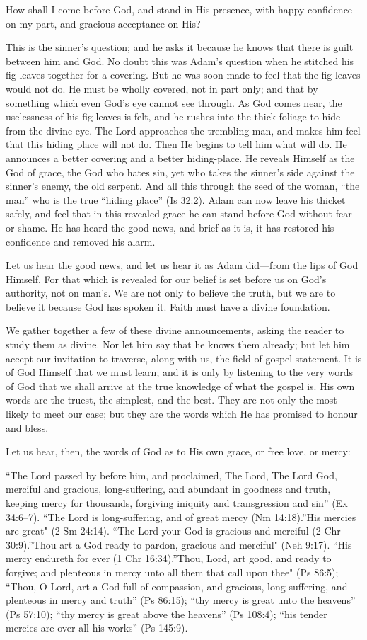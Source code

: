 \documentclass[
]{book}
\begin{document}
How shall I come before God, and stand in His presence, with happy confidence on my part, and gracious acceptance on His?

This is the sinner's question; and he asks it because he knows that there is guilt between him and God. No doubt this was Adam's question when he stitched his fig leaves together for a covering. But he was soon made to feel that the fig leaves would not do. He must be wholly covered, not in part only; and that by something which even God's eye cannot see through. As God comes near, the uselessness of his fig leaves is felt, and he rushes into the thick foliage to hide from the divine eye. The Lord approaches the trembling man, and makes him feel that this hiding place will not do. Then He begins to tell him what will do. He announces a better covering and a better hiding-place. He reveals Himself as the God of grace, the God who hates sin, yet who takes the sinner's side against the sinner's enemy, the old serpent. And all this through the seed of the woman, ``the man'' who is the true ``hiding place'' (Is 32:2). Adam can now leave his thicket safely, and feel that in this revealed grace he can stand before God without fear or shame. He has heard the good news, and brief as it is, it has restored his confidence and removed his alarm.

Let us hear the good news, and let us hear it as Adam did---from the lips of God Himself. For that which is revealed for our belief is set before us on God's authority, not on man's. We are not only to believe the truth, but we are to believe it because God has spoken it. Faith must have a divine foundation.

We gather together a few of these divine announcements, asking the reader to study them as divine. Nor let him say that he knows them already; but let him accept our invitation to traverse, along with us, the field of gospel statement. It is of God Himself that we must learn; and it is only by listening to the very words of God that we shall arrive at the true knowledge of what the gospel is. His own words are the truest, the simplest, and the best. They are not only the most likely to meet our case; but they are the words which He has promised to honour and bless.

Let us hear, then, the words of God as to His own grace, or free love, or mercy:

``The Lord passed by before him, and proclaimed, The Lord, The Lord God, merciful and gracious, long-suffering, and abundant in goodness and truth, keeping mercy for thousands, forgiving iniquity and transgression and sin'' (Ex 34:6--7). ``The Lord is long-suffering, and of great mercy (Nm 14:18).''His mercies are great" (2 Sm 24:14). ``The Lord your God is gracious and merciful (2 Chr 30:9).''Thou art a God ready to pardon, gracious and merciful" (Neh 9:17). ``His mercy endureth for ever (1 Chr 16:34).''Thou, Lord, art good, and ready to forgive; and plenteous in mercy unto all them that call upon thee" (Ps 86:5); ``Thou, O Lord, art a God full of compassion, and gracious, long-suffering, and plenteous in mercy and truth'' (Ps 86:15); ``thy mercy is great unto the heavens'' (Ps 57:10); ``thy mercy is great above the heavens'' (Ps 108:4); ``his tender mercies are over all his works'' (Ps 145:9).
\end{document}
